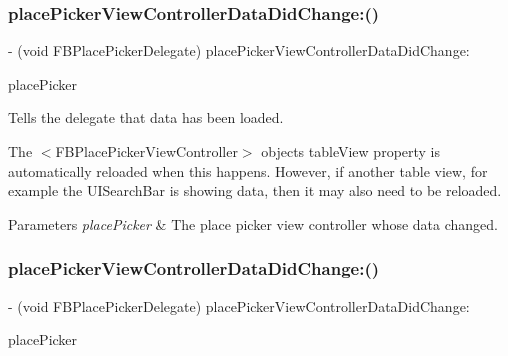 \subsubsection{\texorpdfstring{place\+Picker\+View\+Controller\+Data\+Did\+Change\+:()}{placePickerViewControllerDataDidChange:()}\hspace{0.1cm}{\footnotesize\ttfamily [2/5]}}
{\footnotesize\ttfamily -\/ (void F\+B\+Place\+Picker\+Delegate) place\+Picker\+View\+Controller\+Data\+Did\+Change\+: \begin{DoxyParamCaption}\item[{(\hyperlink{interfaceFBPlacePickerViewController}{F\+B\+Place\+Picker\+View\+Controller} $\ast$)}]{place\+Picker }\end{DoxyParamCaption}\hspace{0.3cm}{\ttfamily [optional]}}

Tells the delegate that data has been loaded.

The $<$\+F\+B\+Place\+Picker\+View\+Controller$>$ object\textquotesingle{}s {\ttfamily table\+View} property is automatically reloaded when this happens. However, if another table view, for example the {\ttfamily U\+I\+Search\+Bar} is showing data, then it may also need to be reloaded.


\begin{DoxyParams}{Parameters}
{\em place\+Picker} & The place picker view controller whose data changed. \\
\hline
\end{DoxyParams}
\mbox{\label{protocolFBPlacePickerDelegate_01-p_aaa234bae2ec98cf414ef201da6264c67}} 
\subsubsection{\texorpdfstring{place\+Picker\+View\+Controller\+Data\+Did\+Change\+:()}{placePickerViewControllerDataDidChange:()}\hspace{0.1cm}{\footnotesize\ttfamily [3/5]}}
{\footnotesize\ttfamily -\/ (void F\+B\+Place\+Picker\+Delegate) place\+Picker\+View\+Controller\+Data\+Did\+Change\+: \begin{DoxyParamCaption}\item[{(\hyperlink{interfaceFBPlacePickerViewController}{F\+B\+Place\+Picker\+View\+Controller} $\ast$)}]{place\+Picker }\end{DoxyParamCaption}\hspace{0.3cm}{\ttfamily [optional]}}

